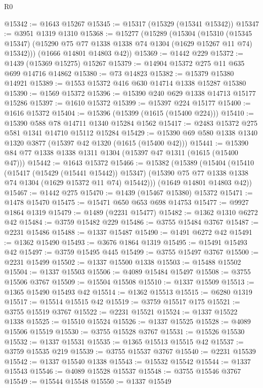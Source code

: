 \begin{lexlean}{R0}
\begin{coremodule}
@15342 := @1643 @15267
@15345 := @15317 (@15329 (@15341 @15342))
@15347 := @3951 @1319 @1310
@15368 := @15277
    (@15289
      (@15304
        (@15310
          (@15345 @15347)
          (@15290 @75 @77 @1338 @1338 @74 @1304 (@1629 @15267 @11 @74) @15342)))
      (@1666 @14801 @14803 @42))
@15369 := @1442 @229
@15372 := @1439 (@15369 @15275) @15267
@15379 := @14904 @15372 @275 @11 @635 @699 @14716 @14862
@15380 := @73 @14823
@15382 := @15379 @15380 @14921
@15389 := @1553 @15372 @416 @630 @14714 @1338 @15287 @15380
@15390 := @1569 @15372
@15396 := @15390 @240 @629 @1338 @14713 @15177 @15286
@15397 := @1610 @15372
@15399 := @15397 @224 @15177
@15400 := @1616 @15372
@15404 := @15396 (@15399 (@1615 (@15400 @224)))
@15410 := @15390 @588 @78 @14711 @1340 @15284 @1562
@15417 := @2483 @15372 @275 @581 @1341 @14710 @15112 @15284
@15429 := @15390 @69 @580 @1338 @1340 @1320 @3877 (@15397 @42 @1320 (@1615 (@15400 @42)))
@15441 := @15390 @84 @77 @1338 @1338 @1311 @1304 (@15397 @47 @1311 (@1615 (@15400 @47)))
@15442 := @1643 @15372
@15466 := @15382
    (@15389
      (@15404
        (@15410
          (@15417 (@15429 (@15441 @15442)) @15347)
          (@15390 @75 @77 @1338 @1338 @74 @1304 (@1629 @15372 @11 @74) @15442)))
      (@1649 @14801 @14803 @42))
@15467 := @1442 @275
@15470 := @1439 (@15467 @15380) @15372
@15471 := @1478 @15470
@15475 := @15471 @650 @653 @698 @14753
@15477 := @9927 @1864 @1319
@15479 := @1489 (@2231 @15477)
@15482 := @1362 @1310 @6272 @42
@15484 := @3759 @15482 @229
@15486 := @3755 @15484 @3767
@15487 := @2231 @15486
@15488 := @1337 @15487
@15490 := @1491 @6272 @42
@15491 := @1362 @15490
@15493 := @3676 @1864 @1319
@15495 := @15491 @15493 @42
@15497 := @3759 @15495 @445
@15499 := @3755 @15497 @3767
@15500 := @2231 @15499
@15502 := @1337 @15500 @1338
@15503 := @15488 @15502
@15504 := @1337 @15503
@15506 := @4089 @15484 @15497
@15508 := @3755 @15506 @3767
@15509 := @15504 @15508
@15510 := @1337 @15509
@15513 := @1365 @15490 @15493 @42
@15514 := @1362 @15513
@15515 := @6280 @1319
@15517 := @15514 @15515 @42
@15519 := @3759 @15517 @175
@15521 := @3755 @15519 @3767
@15522 := @2231 @15521
@15524 := @1337 @15522 @1338
@15525 := @15510 @15524
@15526 := @1337 @15525
@15528 := @4089 @15506 @15519
@15530 := @3755 @15528 @3767
@15531 := @15526 @15530
@15532 := @1337 @15531
@15535 := @1365 @15513 @15515 @42
@15537 := @3759 @15535 @219
@15539 := @3755 @15537 @3767
@15540 := @2231 @15539
@15542 := @1337 @15540 @1338
@15543 := @15532 @15542
@15544 := @1337 @15543
@15546 := @4089 @15528 @15537
@15548 := @3755 @15546 @3767
@15549 := @15544 @15548
@15550 := @1337 @15549

\end{coremodule}
\end{lexlean}
